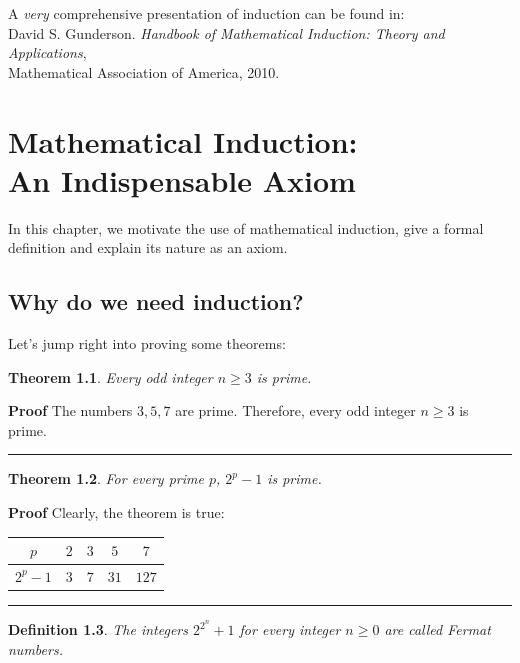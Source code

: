 \documentclass[11pt,a4paper]{report}
\newcommand*{\qed}{\hfill\rule{1ex}{1.5ex}}
\newcommand*{\qedd}[1]{\vspace*{-#1ex}\qed}
\newtheorem{theorem}{Theorem}
\newtheorem{definition}[theorem]{Definition}
\begin{document}
\bigskip

A \emph{very} comprehensive presentation of induction can be found in:\\
David S. Gunderson. \textit{Handbook of Mathematical Induction: Theory and Applications},\\
Mathematical Association of America, 2010.


\chapter[Mathematical Induction: An Indispensable Axiom]{Mathematical Induction:\\An Indispensable Axiom}\label{s.axiom}

In this chapter, we motivate the use of mathematical induction, give a formal definition and explain its nature as an axiom.

\section{Why do we need induction?}\label{s.why}

Let's jump right into proving some theorems:

\begin{theorem}\label{t.odd}
Every odd integer $n\geq 3$ is prime.
\end{theorem}

\textbf{Proof} The numbers $3,5,7$ are prime. Therefore, every odd integer $n\geq 3$ is prime.\qed

\begin{theorem}\label{t.odd-prime}
For every prime $p$, $2^p-1$ is prime.
\end{theorem}

\textbf{Proof} 
Clearly, the theorem is true:
\begin{center}
\begin{tabular}{|c|c|c|c|c|}
\hline
$p$ & $2$ & $3$ & $5$ & $7$ \\\hline
$2^p-1$ & $3$ & $7$ & $31$ & $127$ \\\hline
\end{tabular}
\end{center}

\qedd{4}

\begin{definition}
The integers $2^{2^{n}}+1$ for every integer $n\geq 0$ are called \emph{Fermat numbers}.
\end{definition}
\end{document}

